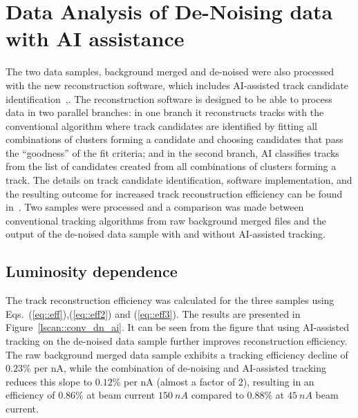 \section{Data Analysis of De-Noising data with AI assistance}

The two data samples, background merged and de-noised were also processed with the new 
reconstruction software, which includes AI-assisted track candidate identification~\cite{Gavalian:2020oxg},\cite{Gavalian:2020xmc}. 
The reconstruction software is designed to be able to process data in two parallel branches: in one 
branch it reconstructs tracks with the conventional algorithm where track candidates are identified by fitting all 
combinations of clusters forming a candidate and choosing candidates that pass the ``goodness'' of the fit criteria; 
 and in the second branch, AI classifies tracks from the list of candidates created from all combinations of clusters 
 forming a track. 
 The details on track candidate identification, software implementation, and the resulting outcome for increased 
 track reconstruction efficiency can be found in~\cite{Gavalian:2022hfa}.
 Two samples were processed and a comparison was made between conventional tracking algorithms from raw 
 background merged files and the output of the de-noised data sample with and without AI-assisted tracking. 

\subsection{Luminosity dependence}

The track reconstruction efficiency was calculated for the three samples using Eqs.~(\ref{eq::eff}),(\ref{eq::eff2}) and (\ref{eq::eff3}).
The results are presented in Figure~\ref{lscan::conv_dn_ai}. It can be seen from the figure that using 
AI-assisted tracking on the de-noised data sample further improves reconstruction efficiency. The raw background 
merged data sample exhibits a tracking efficiency decline of $0.23\%$ per nA, while the combination of de-noising 
and AI-assisted tracking reduces this slope to $0.12\%$ per nA (almost a factor of 2), resulting in an efficiency of $0.86\%$ at
 beam current $150~nA$ compared to $0.88\%$ at $45~nA$ beam current. 

